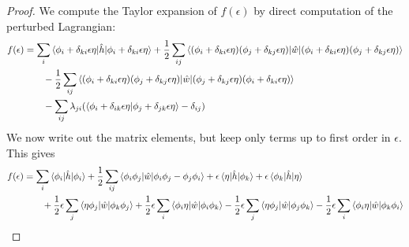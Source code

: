 \documentclass{report}
\theoremstyle{plain}
\theoremstyle{definition}
\begin{document}
\begin{proof}
  We compute the Taylor expansion of $f(\epsilon)$ by direct
  computation of the perturbed Lagrangian:
  \begin{equation}
    \begin{split}
      f(\epsilon) 
      &= \sum_i
      \braket{\phi_i + \delta_{ki}\epsilon\eta|\hat{h}|\phi_i + \delta_{ki}\epsilon\eta} +
      \frac{1}{2}\sum_{ij} \braket{(\phi_i + \delta_{ki}\epsilon\eta)(\phi_j +
        \delta_{kj}\epsilon\eta)|\hat{w}|(\phi_i + \delta_{ki}\epsilon\eta)(\phi_j +
        \delta_{kj}\epsilon\eta)} \\ &\qquad - \frac{1}{2}\sum_{ij}
      \braket{(\phi_i + \delta_{ki}\epsilon\eta)(\phi_j +
        \delta_{kj}\epsilon\eta)|\hat{w}|(\phi_j + \delta_{kj}\epsilon\eta)(\phi_i +
        \delta_{ki}\epsilon\eta)} \\&\qquad- \sum_{ij} \lambda_{ji}(\braket{\phi_i +
        \delta_{ik}\epsilon\eta|\phi_j + \delta_{jk}\epsilon\eta} - \delta_{ij}) 
    \end{split}
  \end{equation}
  We now write out the matrix elements, but keep only terms up to
  first order in $\epsilon$. This gives
  \begin{equation}
    \begin{split}
      f(\epsilon) &= \sum_i \braket{\phi_i|\hat{h}|\phi_i} +
      \frac{1}{2}\sum_{ij} \braket{\phi_i \phi_j|\hat{w}|\phi_i\phi_j
        - \phi_j \phi_i} +
      \epsilon\braket{\eta|\hat{h}|\phi_k} +
      \epsilon\braket{\phi_k|\hat{h}|\eta} \\ 
      & \qquad + \frac{1}{2}\epsilon \sum_j
      \braket{\eta\phi_j|\hat{w}|\phi_k\phi_j} + \frac{1}{2} \epsilon\sum_i
      \braket{\phi_i \eta|\hat{w}|\phi_i \phi_k} 
      - \frac{1}{2}\epsilon \sum_j
      \braket{\eta\phi_j|\hat{w}|\phi_j\phi_k} - \frac{1}{2} \epsilon\sum_i
      \braket{\phi_i \eta|\hat{w}|\phi_k \phi_i} \\

\end{split}
\end{equation}
\end{proof}
\end{document}
